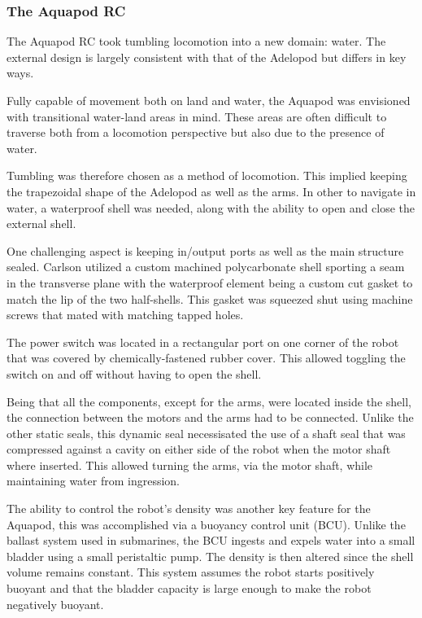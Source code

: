 		\subsubsection{The Aquapod RC}

		The Aquapod RC \cite{Carlson2011} took tumbling locomotion into a new domain: water. The external design is largely consistent with that of the Adelopod but differs in key ways. 

		Fully capable of movement both on land and water, the Aquapod was envisioned with transitional water-land areas in mind. These areas are often difficult to traverse both from a locomotion perspective but also due to the presence of water. 

		Tumbling was therefore chosen as a method of locomotion. This implied keeping the trapezoidal shape of the Adelopod as well as the arms. In other to navigate in water, a waterproof shell was needed, along with the ability to open and close the external shell. 

		One challenging aspect is keeping in/output ports as well as the main structure sealed. Carlson \cite{Carlson2011} utilized a custom machined polycarbonate shell sporting a seam in the transverse plane with the waterproof element being a custom cut gasket to match the lip of the two half-shells. This gasket was squeezed shut using machine screws that mated with matching tapped holes.   

		The power switch was located in a rectangular port on one corner of the robot that was covered by chemically-fastened rubber cover. This allowed toggling the switch on and off without having to open the shell. 

		Being that all the components, except for the arms, were located inside the shell, the connection between the motors and the arms had to be connected. Unlike the other static seals, this dynamic seal necessisated the use of a shaft seal that was compressed against a cavity on either side of the robot when the motor shaft where inserted. This allowed turning the arms, via the motor shaft, while maintaining water from ingression. 

		The ability to control the robot's density was another key feature for the Aquapod, this was accomplished via a buoyancy control unit (BCU). Unlike the ballast system used in submarines, the BCU ingests and expels water into a small bladder using a small peristaltic pump. The density is then altered since the shell volume remains constant. This system assumes the robot starts positively buoyant and that the bladder capacity is large enough to make the robot negatively buoyant. 

